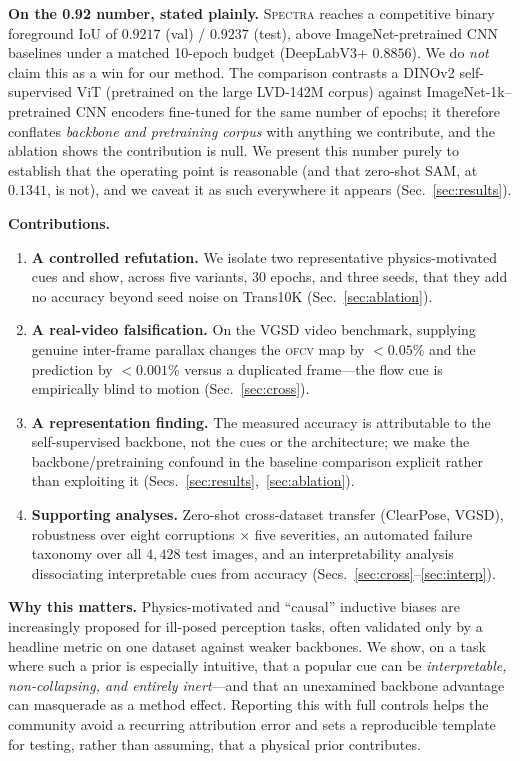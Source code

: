 \documentclass{bmvc2k}
\newcommand{\spectra}{\textsc{Spectra}}
\newcommand{\ofcv}{\textsc{ofcv}}
\newcommand{\dinov}{DINOv2}
\newcommand{\iou}{IoU}
\begin{document}
\textbf{On the 0.92 number, stated plainly.} \spectra{} reaches a competitive
binary foreground \iou{} of $0.9217$ (val) / $0.9237$ (test), above
ImageNet-pretrained CNN baselines under a matched 10-epoch budget
(DeepLabV3+ $0.8856$). We do \emph{not} claim this as a win for our method. The
comparison contrasts a \dinov{} self-supervised ViT (pretrained on the large
LVD-142M corpus) against ImageNet-1k--pretrained CNN encoders fine-tuned for the
same number of epochs; it therefore conflates \emph{backbone and pretraining
corpus} with anything we contribute, and the ablation shows the contribution is
null. We present this number purely to establish that the operating point is
reasonable (and that zero-shot SAM, at $0.1341$, is not), and we caveat it as
such everywhere it appears (Sec.~\ref{sec:results}).

\textbf{Contributions.}
\begin{enumerate}
\item \textbf{A controlled refutation.} We isolate two representative
physics-motivated cues and show, across five variants, 30 epochs, and three
seeds, that they add no accuracy beyond seed noise on Trans10K
(Sec.~\ref{sec:ablation}).
\item \textbf{A real-video falsification.} On the VGSD video benchmark, supplying
genuine inter-frame parallax changes the \ofcv{} map by $<0.05\%$ and the
prediction by $<0.001\%$ versus a duplicated frame---the flow cue is empirically
blind to motion (Sec.~\ref{sec:cross}).
\item \textbf{A representation finding.} The measured accuracy is attributable to
the self-supervised backbone, not the cues or the architecture; we make the
backbone/pretraining confound in the baseline comparison explicit rather than
exploiting it (Secs.~\ref{sec:results},~\ref{sec:ablation}).
\item \textbf{Supporting analyses.} Zero-shot cross-dataset transfer (ClearPose,
VGSD), robustness over eight corruptions $\times$ five severities, an automated
failure taxonomy over all $4{,}428$ test images, and an interpretability
analysis dissociating interpretable cues from accuracy
(Secs.~\ref{sec:cross}--\ref{sec:interp}).
\end{enumerate}

\textbf{Why this matters.} Physics-motivated and ``causal'' inductive biases are
increasingly proposed for ill-posed perception tasks, often validated only by a
headline metric on one dataset against weaker backbones. We show, on a task
where such a prior is especially intuitive, that a popular cue can be
\emph{interpretable, non-collapsing, and entirely inert}---and that an
unexamined backbone advantage can masquerade as a method effect. Reporting this
with full controls helps the community avoid a recurring attribution error and
sets a reproducible template for testing, rather than assuming, that a physical
prior contributes.
\end{document}
